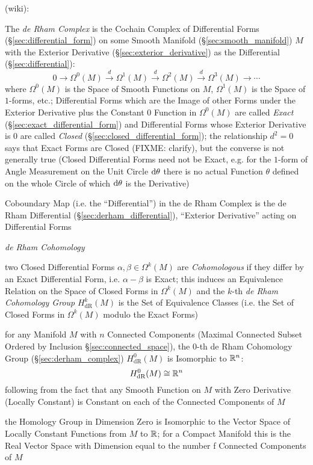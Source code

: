 (wiki):

The \emph{de Rham Complex} is the Cochain Complex of Differential Forms
(\S\ref{sec:differential_form}) on some Smooth Manifold
(\S\ref{sec:smooth_manifold}) $M$ with the Exterior Derivative
(\S\ref{sec:exterior_derivative}) as the Differential
(\S\ref{sec:differential}):
\[
  0 \rightarrow \Omega^0(M) \xrightarrow{d} \Omega^1(M) \xrightarrow{d}
  \Omega^2(M) \xrightarrow{d} \Omega^3(M) \rightarrow \cdots
\]
where $\Omega^0(M)$ is the Space of Smooth Functions on $M$, $\Omega^1(M)$ is
the Space of $1$-forms, etc.; Differential Forms which are the Image of other
Forms under the Exterior Derivative plus the Constant $0$ Function in
$\Omega^0(M)$ are called \emph{Exact} (\S\ref{sec:exact_differential_form}) and
Differential Forms whose Exterior Derivative is $0$ are called \emph{Closed}
(\S\ref{sec:closed_differential_form}); the relationship $d^2 = 0$ says that
Exact Forms are Closed (FIXME: clarify), but the converse is not generally true
(Closed Differential Forms need not be Exact, e.g. for the $1$-form of Angle
Measurement on the Unit Circle $\mathrm{d}\theta$ there is no actual Function
$\theta$ defined on the whole Circle of which $\mathrm{d}\theta$ is the
Derivative)

Coboundary Map (i.e. the ``Differential'') in the de Rham Complex is the de Rham
Differential (\S\ref{sec:derham_differential}), ``Exterior Derivative'' acting
on Differential Forms

\emph{de Rham Cohomology}

two Closed Differential Forms $\alpha, \beta \in \Omega^k(M)$ are
\emph{Cohomologous} if they differ by an Exact Differential Form, i.e. $\alpha -
\beta$ is Exact; this induces an Equivalence Relation on the Space of Closed
Forms in $\Omega^k(M)$ and the $k$-th \emph{de Rham Cohomology Group}
$H_{\mathrm{dR}}^k(M)$ is the Set of Equivalence Classes (i.e. the Set of Closed
Forms in $\Omega^k(M)$ modulo the Exact Forms)

for any Manifold $M$ with $n$ Connected Components (Maximal Connected Subset
Ordered by Inclusion \S\ref{sec:connected_space}), the $0$-th de Rham Cohomology
Group (\S\ref{sec:derham_complex}) $H_{\mathrm{dR}}^0(M)$ is Isomorphic to
$\mathbb{R}^n$:
\[
  H_{\mathrm{dR}}^0(M) \cong \mathbb{R}^n
\]
following from the fact that any Smooth Function on $M$ with Zero Derivative
(Locally Constant) is Constant on each of the Connected Components of $M$

the Homology Group in Dimension Zero is Isomorphic to the Vector Space of
Locally Constant Functions from $M$ to $\mathbb{R}$; for a Compact Manifold this is
the Real Vector Space with Dimension equal to the number f Connected Components
of $M$


